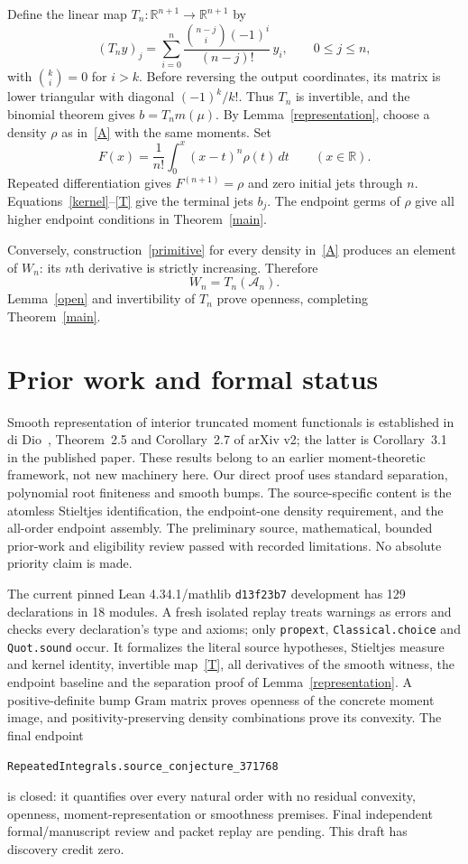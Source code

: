 \documentclass[11pt]{article}
\newcommand{\R}{\mathbb R}
\newcommand{\A}{\mathcal A}
\begin{document}
Define the linear map $T_n:\R^{n+1}\to\R^{n+1}$ by
\begin{equation}\label{T}
 (T_ny)_j=\sum_{i=0}^n
 \frac{\binom{n-j}{i}(-1)^i}{(n-j)!}\,y_i,
 \qquad 0\le j\le n,
\end{equation}
with $\binom{k}{i}=0$ for $i>k$. Before reversing the output coordinates,
its matrix is lower triangular with diagonal $(-1)^k/k!$. Thus $T_n$
is invertible, and the binomial theorem gives $b=T_nm(\mu)$.
By Lemma~\ref{representation}, choose a density $\rho$ as in~\eqref{A}
with the same moments. Set
\begin{equation}\label{primitive}
 F(x)=\frac1{n!}\int_0^x(x-t)^n\rho(t)\,dt\qquad(x\in\R).
\end{equation}
Repeated differentiation gives $F^{(n+1)}=\rho$ and zero initial jets
through $n$. Equations~\eqref{kernel}--\eqref{T} give the terminal jets
$b_j$. The endpoint germs of $\rho$ give all higher endpoint conditions
in Theorem~\ref{main}.

Conversely, construction~\eqref{primitive} for every density in~\eqref{A}
produces an element of $W_n$: its $n$th derivative is strictly increasing.
Therefore
\[
 W_n=T_n(\A_n).
\]
Lemma~\ref{open} and invertibility of $T_n$ prove openness, completing
Theorem~\ref{main}.

\section{Prior work and formal status}
Smooth representation of interior truncated moment functionals is established
in di Dio~\cite{diDio}, Theorem~2.5 and Corollary~2.7 of arXiv v2; the
latter is Corollary~3.1 in the published paper. These results belong to an
earlier moment-theoretic framework, not new machinery here. Our direct proof
uses standard separation, polynomial root finiteness and smooth bumps.
The source-specific content is the atomless Stieltjes identification,
the endpoint-one density requirement, and the all-order endpoint assembly.
The preliminary source, mathematical, bounded prior-work and eligibility
review passed with recorded limitations. No absolute priority claim is made.

The current pinned Lean 4.34.1/mathlib \texttt{d13f23b7} development has
129 declarations in 18 modules. A fresh isolated replay treats warnings as
errors and checks every declaration's type and axioms; only
\texttt{propext}, \texttt{Classical.choice} and \texttt{Quot.sound} occur.
It formalizes the literal source hypotheses, Stieltjes measure and kernel
identity, invertible map~\eqref{T}, all derivatives of the smooth witness,
the endpoint baseline and the separation proof of
Lemma~\ref{representation}. A positive-definite bump Gram matrix proves
openness of the concrete moment image, and positivity-preserving density
combinations prove its convexity. The final endpoint
\begin{center}
\texttt{RepeatedIntegrals.source\_conjecture\_371768}
\end{center}
is closed: it quantifies over every natural order with no residual
convexity, openness, moment-representation or smoothness premises.
Final independent formal/manuscript review and packet replay are pending.
This draft has discovery credit zero.
\end{document}
